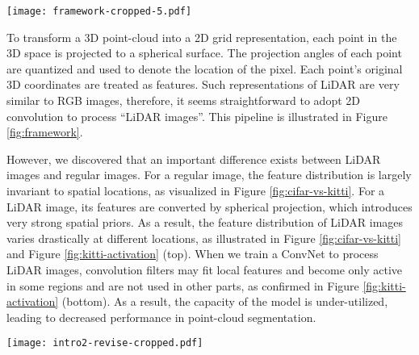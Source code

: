 \documentclass[runningheads]{llncs}
\begin{document}
\begin{figure*}[ht]
\centering
\texttt{[image: framework-cropped-5.pdf]}
\caption{The framework of SqueezeSegV3. A LiDAR point cloud is projected to generate a LiDAR image, which is then processed by spatially adaptive convolutions (SAC). The network outputs a point-wise prediction that can be restored to label the 3D point cloud. 
Other variants of SAC can be found in Figure \ref{fig:form}.
}
\label{fig:framework}
\end{figure*}
\vspace*{-6mm}
To transform a 3D point-cloud into a 2D grid representation, each point in the 3D space is projected to a spherical surface. The projection angles of each point are quantized and used to denote the location of the pixel. Each point's original 3D coordinates are treated as features. Such representations of LiDAR are very similar to RGB images, therefore, it seems straightforward to adopt 2D convolution to process ``LiDAR images''. This pipeline is illustrated in Figure \ref{fig:framework}.  

However, we discovered that an important difference exists between LiDAR images and regular images. For a regular image, the feature distribution is largely invariant to spatial locations, as visualized in Figure \ref{fig:cifar-vs-kitti}. For a LiDAR image, its features are converted by spherical projection, which introduces very strong spatial priors. As a result, the feature distribution of LiDAR images varies drastically at different locations, as illustrated in Figure \ref{fig:cifar-vs-kitti} and Figure \ref{fig:kitti-activation} (top). When we train a ConvNet to process LiDAR images, convolution filters may fit local features and become only active in some regions and are not used in other parts, as confirmed in Figure \ref{fig:kitti-activation} (bottom). As a result, the capacity of the model is under-utilized, leading to decreased performance in point-cloud segmentation. 

\begin{figure*}[t!]
\centering
\texttt{[image: intro2-revise-cropped.pdf]}
\caption{Pixel-wise feature distribution at nine sampled locations from COCO2017~\cite{lin2014microsoft}, CIFAR10~\cite{krizhevsky2009learning} and SemanticKITTI~\cite{behley2019iccv}. The left shows the distribution of the red channel across all images in COCO2017 and CIFAR10. The right shows the distribution of the X coordinates across all LiDAR images in SemanticKITTI.}
\label{fig:cifar-vs-kitti}
\centering
\end{figure*}
\end{document}
